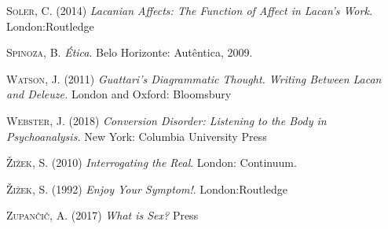 \textsc{Soler}, C. (2014) \emph{Lacanian Affects: The Function of Affect in
Lacan's Work.} London:Routledge

\textsc{Spinoza}, B. \emph{Ética}. Belo Horizonte: Autêntica, 2009.

\textsc{Watson}, J. (2011) \emph{Guattari's Diagrammatic Thought. Writing Between
Lacan and Deleuze.} London and Oxford: Bloomsbury

\textsc{Webster}, J. (2018) \emph{Conversion Disorder: Listening to the Body in
Psychoanalysis.} New York: Columbia University Press

\textsc{Žižek}, S. (2010) \emph{Interrogating the Real}. London: Continuum.

\textsc{Žižek}, S. (1992) \emph{Enjoy Your Symptom!}. London:Routledge

\textsc{Zupančič}, A. (2017) \emph{What is Sex?}  Press
